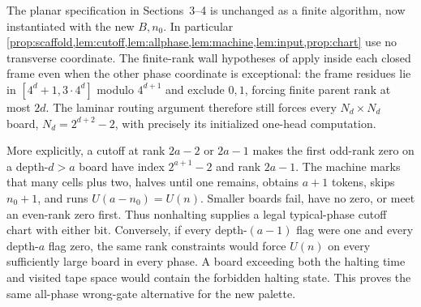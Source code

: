 The planar specification in Sections~3--4 is unchanged as a finite algorithm, now instantiated with the new $B,n_0$. In particular \cref{prop:scaffold,lem:cutoff,lem:allphase,lem:machine,lem:input,prop:chart} use no transverse coordinate. The finite-rank wall hypotheses of \cite[Lemmas~A.6--A.7]{DMhard} apply inside each closed frame even when the other phase coordinate is exceptional: the frame residues lie in $[4^d+1,3\cdot4^d]$ modulo $4^{d+1}$ and exclude $0,1$, forcing finite parent rank at most $2d$. The laminar routing argument therefore still forces every $N_d\times N_d$ board, $N_d=2^{d+2}-2$, with precisely its initialized one-head computation.

More explicitly, a cutoff at rank $2a-2$ or $2a-1$ makes the first odd-rank zero on a depth-$d>a$ board have index $2^{a+1}-2$ and rank $2a-1$. The machine marks that many cells plus two, halves until one remains, obtains $a+1$ tokens, skips $n_0+1$, and runs $U(a-n_0)=U(n)$. Smaller boards fail, have no zero, or meet an even-rank zero first. Thus nonhalting supplies a legal typical-phase cutoff chart with either bit. Conversely, if every depth-$(a-1)$ flag were one and every depth-$a$ flag zero, the same rank constraints would force $U(n)$ on every sufficiently large board in every phase. A board exceeding both the halting time and visited tape space would contain the forbidden halting state. This proves the same all-phase wrong-gate alternative for the new palette.


